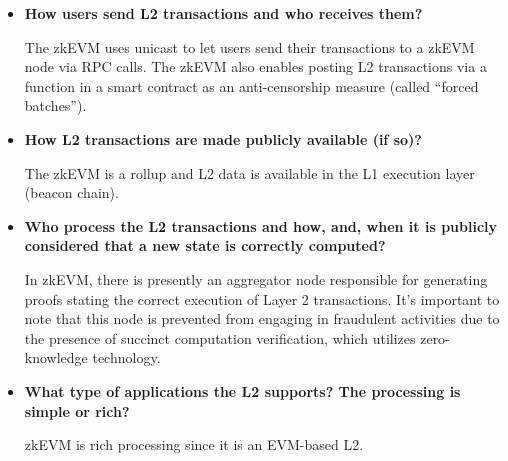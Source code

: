 \begin{itemize}

\item \textbf{How users send L2 transactions and who receives them?}

The zkEVM uses unicast to let users send their transactions to a zkEVM node via RPC calls. The zkEVM also enables posting L2 transactions via a function in a smart contract as an anti-censorship measure (called ``forced batches'').

\item \textbf{How L2 transactions are made publicly available (if so)?}

The zkEVM is a rollup and L2 data is available in the L1 execution layer (beacon chain).

\item \textbf{Who process the L2 transactions and how, and, when it is publicly considered that a new state is correctly computed?}

In zkEVM, there is presently an aggregator node responsible for generating proofs stating the correct execution of Layer 2 transactions. It's important to note that this node is prevented from engaging in fraudulent activities due to the presence of succinct computation verification, which utilizes zero-knowledge technology.

\item \textbf{What type of applications the L2 supports? The processing is simple or rich?}

zkEVM is rich processing since it is an EVM-based L2.

\end{itemize}


